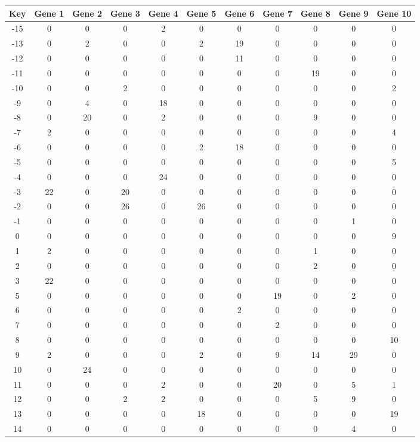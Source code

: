 \begin{tabular}{|c|c|c|c|c|c|c|c|c|c|c|}
\hline
Key & Gene 1 & Gene 2 & Gene 3 & Gene 4 & Gene 5 & Gene 6 & Gene 7 & Gene 8 & Gene 9 & Gene 10 \\
\hline
-15 & 0 & 0 & 0 & 2 & 0 & 0 & 0 & 0 & 0 & 0 \\
-13 & 0 & 2 & 0 & 0 & 2 & 19 & 0 & 0 & 0 & 0 \\
-12 & 0 & 0 & 0 & 0 & 0 & 11 & 0 & 0 & 0 & 0 \\
-11 & 0 & 0 & 0 & 0 & 0 & 0 & 0 & 19 & 0 & 0 \\
-10 & 0 & 0 & 2 & 0 & 0 & 0 & 0 & 0 & 0 & 2 \\
-9 & 0 & 4 & 0 & 18 & 0 & 0 & 0 & 0 & 0 & 0 \\
-8 & 0 & 20 & 0 & 2 & 0 & 0 & 0 & 9 & 0 & 0 \\
-7 & 2 & 0 & 0 & 0 & 0 & 0 & 0 & 0 & 0 & 4 \\
-6 & 0 & 0 & 0 & 0 & 2 & 18 & 0 & 0 & 0 & 0 \\
-5 & 0 & 0 & 0 & 0 & 0 & 0 & 0 & 0 & 0 & 5 \\
-4 & 0 & 0 & 0 & 24 & 0 & 0 & 0 & 0 & 0 & 0 \\
-3 & 22 & 0 & 20 & 0 & 0 & 0 & 0 & 0 & 0 & 0 \\
-2 & 0 & 0 & 26 & 0 & 26 & 0 & 0 & 0 & 0 & 0 \\
-1 & 0 & 0 & 0 & 0 & 0 & 0 & 0 & 0 & 1 & 0 \\
0 & 0 & 0 & 0 & 0 & 0 & 0 & 0 & 0 & 0 & 9 \\
1 & 2 & 0 & 0 & 0 & 0 & 0 & 0 & 1 & 0 & 0 \\
2 & 0 & 0 & 0 & 0 & 0 & 0 & 0 & 2 & 0 & 0 \\
3 & 22 & 0 & 0 & 0 & 0 & 0 & 0 & 0 & 0 & 0 \\
5 & 0 & 0 & 0 & 0 & 0 & 0 & 19 & 0 & 2 & 0 \\
6 & 0 & 0 & 0 & 0 & 0 & 2 & 0 & 0 & 0 & 0 \\
7 & 0 & 0 & 0 & 0 & 0 & 0 & 2 & 0 & 0 & 0 \\
8 & 0 & 0 & 0 & 0 & 0 & 0 & 0 & 0 & 0 & 10 \\
9 & 2 & 0 & 0 & 0 & 2 & 0 & 9 & 14 & 29 & 0 \\
10 & 0 & 24 & 0 & 0 & 0 & 0 & 0 & 0 & 0 & 0 \\
11 & 0 & 0 & 0 & 2 & 0 & 0 & 20 & 0 & 5 & 1 \\
12 & 0 & 0 & 2 & 2 & 0 & 0 & 0 & 5 & 9 & 0 \\
13 & 0 & 0 & 0 & 0 & 18 & 0 & 0 & 0 & 0 & 19 \\
14 & 0 & 0 & 0 & 0 & 0 & 0 & 0 & 0 & 4 & 0 \\
\hline
\end{tabular}